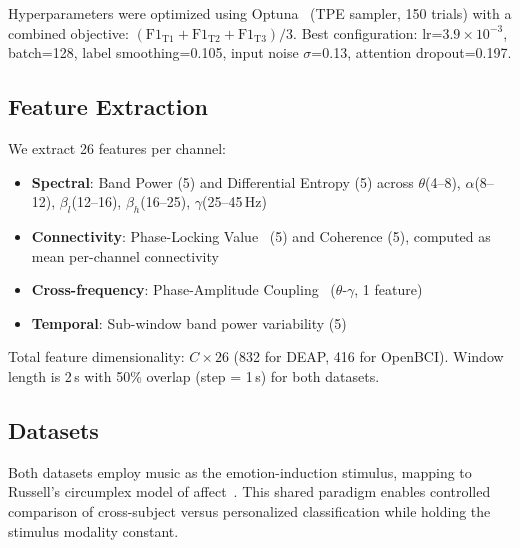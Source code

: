 \documentclass[a4paper, 10pt, conference]{ieeeconf}
\begin{document}
Hyperparameters were optimized using Optuna~\cite{akiba2019} (TPE sampler, 150 trials) with a combined objective: $(\text{F1}_{\text{T1}} + \text{F1}_{\text{T2}} + \text{F1}_{\text{T3}})/3$. Best configuration: lr=$3.9{\times}10^{-3}$, batch=128, label smoothing=0.105, input noise $\sigma$=0.13, attention dropout=0.197.

\subsection{Feature Extraction}

We extract 26 features per channel:
\begin{itemize}
    \item \textbf{Spectral}: Band Power (5) and Differential Entropy (5) across $\theta$(4--8), $\alpha$(8--12), $\beta_l$(12--16), $\beta_h$(16--25), $\gamma$(25--45\,Hz)
    \item \textbf{Connectivity}: Phase-Locking Value~\cite{lachaux1999} (5) and Coherence (5), computed as mean per-channel connectivity
    \item \textbf{Cross-frequency}: Phase-Amplitude Coupling~\cite{canolty2010} ($\theta$-$\gamma$, 1 feature)
    \item \textbf{Temporal}: Sub-window band power variability (5)
\end{itemize}

Total feature dimensionality: $C \times 26$ (832 for DEAP, 416 for OpenBCI). Window length is 2\,s with 50\% overlap (step = 1\,s) for both datasets.

\subsection{Datasets}

Both datasets employ music as the emotion-induction stimulus, mapping to Russell's circumplex model of affect~\cite{russell1980}. This shared paradigm enables controlled comparison of cross-subject versus personalized classification while holding the stimulus modality constant.
\end{document}
